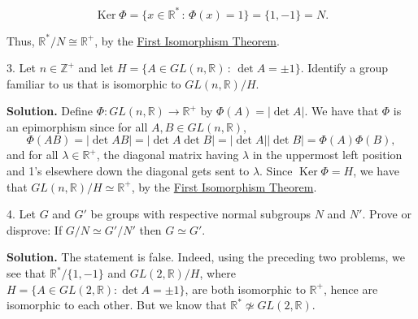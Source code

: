\documentclass[10pt,]{book}
\theoremstyle{plain}
\theoremstyle{definition}
\theoremstyle{definition}
\theoremstyle{definition}
\theoremstyle{definition}
\numberwithin{equation}{section}
\def\Z{\mathbb{Z}}
\def\R{\mathbb{R}}
\DeclareMathOperator{\Ker}{Ker}
\begin{document}
\begin{exerciselist}
\begin{equation*}
\Ker \Phi=\{x\in \R^*\,:\,\Phi(x)=1\}=\{1,-1\}=N.
\end{equation*}
%
\par
Thus, \(\R^*/N \cong \R^+\), by the \hyperref[fit]{First Isomorphism Theorem}.%
\item[3.]\hypertarget{exercise-66}{}Let \(n\in \Z^+\) and let \(H=\{A\in GL(n,\R)\,:\, \det A =\pm
1\}\). Identify a group familiar to us that is isomorphic to \(GL(n,\R)/H\).%
\par\smallskip
\par\smallskip
\noindent\textbf{Solution.}\hypertarget{solution-66}{}\quad
Define \(\Phi:GL(n,\R)\to \R^+\) by \(\Phi(A)=|\det A|\). We have that \(\Phi\) is an epimorphism since for all \(A,B\in GL(n,\R)\),%
\begin{equation*}
\Phi(AB)=|\det AB|=|\det A \det B|=|\det
A||\det B|=\Phi(A)\Phi(B),
\end{equation*}
and for all \(\lambda \in \R^+\), the diagonal matrix having \(\lambda\) in the uppermost left position and 1's elsewhere down the diagonal gets sent to \(\lambda\). Since \(\Ker
\Phi=H\), we have that \(GL(n,\R)/H \simeq \R^+\), by the \hyperref[fit]{First Isomorphism Theorem}.%
\item[4.]\hypertarget{exercise-67}{}Let \(G\) and \(G'\) be groups with respective normal subgroups \(N\) and \(N'\). Prove or disprove: If \(G/N\simeq G'/N'\) then \(G\simeq
G'\).%
\par\smallskip
\par\smallskip
\noindent\textbf{Solution.}\hypertarget{solution-67}{}\quad
The statement is false. Indeed, using the preceding two problems, we see that \(\R^*/\{1,-1\}\) and \(GL(2,\R)/H\), where \(H=\{A\in GL(2,\R):\det A =\pm 1\}\), are both isomorphic to \(\R^+\), hence are isomorphic to each other. But we know that \(\R^* \not\simeq GL(2,\R)\).%
\end{exerciselist}
%
%
%
\appendix
%
\typeout{************************************************}
\typeout{************************************************}
\end{document}
